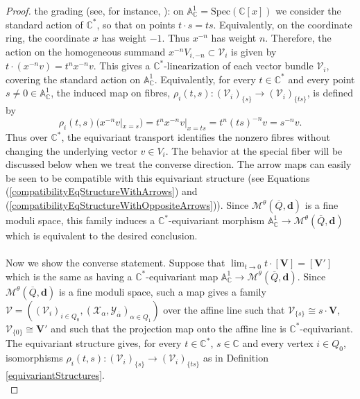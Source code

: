 \documentclass{amsart}
\theoremstyle{plain}
\numberwithin{equation}{section}
\theoremstyle{definition}
\theoremstyle{remark}
\begin{document}
\begin{proof}
		the grading (see, for instance, \cite[Example 39.12.3]{stacksProject}): on
		$\mathbb A_\mathbb{C}^1=\text{Spec}(\mathbb{C}[x])$ we consider the standard action of \(\mathbb C^*\), so that on points $t\cdot s=t s$. Equivalently, on the coordinate ring, the coordinate $x$ has weight
		$-1$. Thus $x^{-n}$ has weight $n$. Therefore, the action
		on the homogeneous summand $x^{-n}V_{i,-n}\subset \mathcal V_i$ is given by
		$t\cdot(x^{-n}v)=t^n x^{-n}v$. This gives a $\mathbb C^*$-linearization of each vector bundle $\mathcal V_i$, covering the standard action on $\mathbb A_{\mathbb{C}}^1$. Equivalently, for every $t\in\mathbb C^*$ and every point
		$s\neq 0\in\mathbb A^1_{\mathbb{C}}$, the induced map on fibres, $\rho_i(t,s):(\mathcal V_i)_{\{s\}}\rightarrow(\mathcal V_i)_{\{t s\}}$, is defined by
		$$
		\rho_i(t,s)(x^{-n}v|_{x=s})
		= t^n x^{-n}v|_{x=t s}=t^n(t s)^{-n}v=s^{-n}v.
		$$
		Thus over \(\mathbb C^*\), the equivariant transport identifies the
		nonzero fibres without changing the underlying vector \(v\in V_i\). The behavior at the special fiber will be discussed below when we treat the converse direction. 
		The arrow maps can easily be seen to be compatible with this equivariant structure (see Equations (\ref{compatibilityEqStructureWithArrows}) and (\ref{compatibilityEqStructureWithOppositeArrows})).
		Since $\mathcal{M}^{\theta}(\overline{Q},\mathbf{d})$ is a fine moduli space, this family induces a $\mathbb{C}^*$-equivariant morphism $\mathbb{A}^{1}_{\mathbb{C}}\to \mathcal{M}^\theta(\overline{Q},\mathbf{d})$ which is equivalent to the desired conclusion. 
		\\
		\\
		Now we show the converse statement. Suppose that $\lim_{t\to 0}t\cdot [\mathbf{V}]=[\mathbf{V}']$ which is the same as having a $\mathbb{C}^*$-equivariant map $\mathbb{A}^1_{\mathbb{C}}\to \mathcal{M}^{\theta}(\overline{Q},\mathbf{d})$. Since $\mathcal{M}^\theta({\overline{Q},\mathbf{d}})$ is a fine moduli space, such a map gives a family $\mathcal{V}=((\mathcal{V}_i)_{i\in Q_0},(\mathcal{X}_{\alpha},\mathcal{Y}_{\overline{\alpha}})_{\alpha\in Q_1})$ over the affine line such that $\mathcal{V}_{\{s\}}\cong s\cdot \mathbf{V}$, $\mathcal{V}_{\{0\}}\cong \mathbf{V}'$  and such that the projection map onto the affine line is $\mathbb{C}^*$-equivariant. The equivariant structure gives, for every $t\in\mathbb C^*$, $s\in \mathbb{C}$ and every vertex \(i\in Q_0\), isomorphisms $\rho_i(t,s):(\mathcal{V}_i)_{\{s\}}\rightarrow (\mathcal{V}_{i})_{\{t s\}}$ as in Definition \ref{equivariantStructures}.
		\\

\end{proof}
\end{document}

